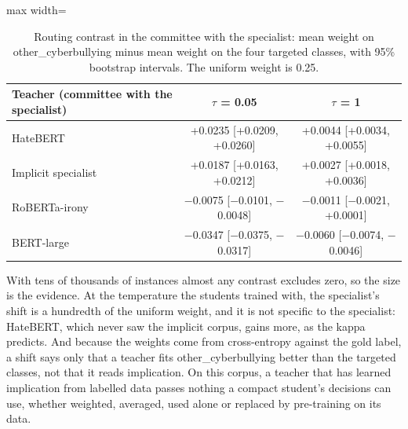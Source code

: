 \begin{table}[htbp]
\centering
\small
\caption[Routing contrast in the committee with the specialist]{Routing contrast in the committee with the specialist: mean weight on other\_cyberbullying minus mean weight on the four targeted classes, with 95\% bootstrap intervals. The uniform weight is 0.25.}
\label{tab:routing}
\begin{adjustbox}{max width=\textwidth}
\begin{tabular}{lcc}
\toprule
Teacher (committee with the specialist) & $\tau$ = 0.05 & $\tau$ = 1 \\
\midrule
HateBERT & +0.0235 [+0.0209, +0.0260] & +0.0044 [+0.0034, +0.0055] \\
Implicit specialist & +0.0187 [+0.0163, +0.0212] & +0.0027 [+0.0018, +0.0036] \\
RoBERTa-irony & $-$0.0075 [$-$0.0101, $-$0.0048] & $-$0.0011 [$-$0.0021, +0.0001] \\
BERT-large & $-$0.0347 [$-$0.0375, $-$0.0317] & $-$0.0060 [$-$0.0074, $-$0.0046] \\
\bottomrule
\end{tabular}
\end{adjustbox}
\end{table}

With tens of thousands of instances almost any contrast excludes zero, so the size is the evidence.
At the temperature the students trained with, the specialist's shift is a hundredth of the uniform
weight, and it is not specific to the specialist: HateBERT, which never saw the implicit corpus,
gains more, as the kappa predicts. And because the weights come from cross-entropy against the gold
label, a shift says only that a teacher fits other\_cyberbullying better than the targeted classes,
not that it reads implication. On this corpus, a teacher that has learned implication from labelled
data passes nothing a compact student's decisions can use, whether weighted, averaged, used alone or
replaced by pre-training on its data.
